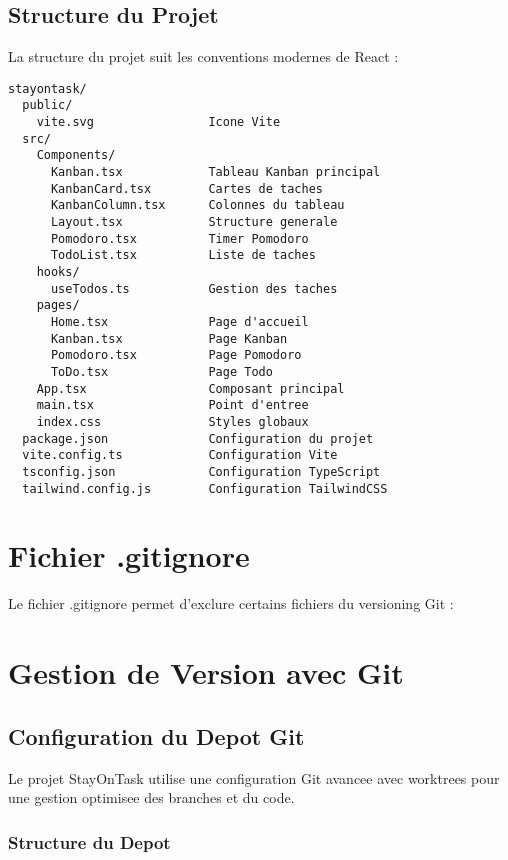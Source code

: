 \documentclass[12pt,a4paper]{article}
\begin{document}
\subsection{Structure du Projet}

La structure du projet suit les conventions modernes de React :

\begin{verbatim}
stayontask/
  public/
    vite.svg                Icone Vite
  src/
    Components/
      Kanban.tsx            Tableau Kanban principal
      KanbanCard.tsx        Cartes de taches
      KanbanColumn.tsx      Colonnes du tableau
      Layout.tsx            Structure generale
      Pomodoro.tsx          Timer Pomodoro
      TodoList.tsx          Liste de taches
    hooks/
      useTodos.ts           Gestion des taches
    pages/
      Home.tsx              Page d'accueil
      Kanban.tsx            Page Kanban
      Pomodoro.tsx          Page Pomodoro
      ToDo.tsx              Page Todo
    App.tsx                 Composant principal
    main.tsx                Point d'entree
    index.css               Styles globaux
  package.json              Configuration du projet
  vite.config.ts            Configuration Vite
  tsconfig.json             Configuration TypeScript
  tailwind.config.js        Configuration TailwindCSS
\end{verbatim}

\section{Fichier .gitignore}

Le fichier .gitignore permet d'exclure certains fichiers du versioning Git :



\section{Gestion de Version avec Git}

\subsection{Configuration du Depot Git}

Le projet StayOnTask utilise une configuration Git avancee avec worktrees pour une gestion optimisee des branches et du code.

\subsubsection{Structure du Depot}
\end{document}
